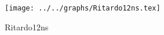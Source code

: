 \begin{figure}[h] \centering\texttt{[image: ../../graphs/Ritardo12ns.tex]}\caption{Ritardo12ns}\label{gr:Ritardo12ns} \end{figure}
